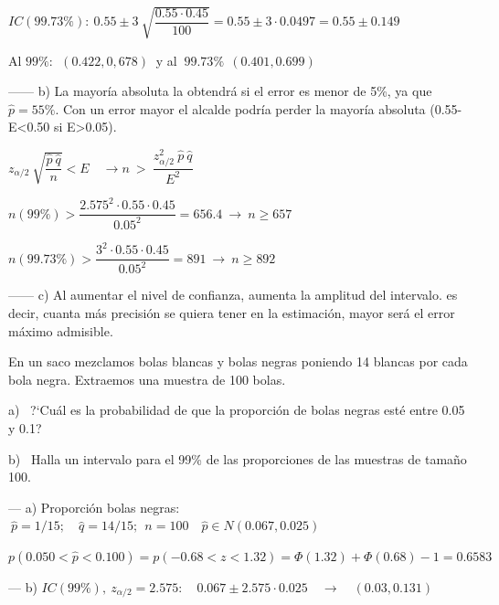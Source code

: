 \vspace{2mm} $IC(99.73\%):\ 0.55  \pm 3 \ \sqrt{ \dfrac{0.55 \cdot 0.45}{100}} = 0.55\pm 3\cdot 0.0497=0.55\pm 0.149$

\vspace{2mm} Al $99\%:\ \ (0.422,0,678 ) \ $ y al $\ 99.73\% \ \ (0.401,0.699)$

\vspace{2mm} ------ b) La mayoría absoluta la obtendrá si el error es menor de 5\%, ya que $\widehat p=55\%$. Con un error mayor el alcalde podría perder la mayoría absoluta (0.55-E<0.50 si E>0.05).

\vspace{2mm} $z_{\alpha/2} \  \sqrt{\dfrac{\hat p \  \hat q}{n}} < E \quad  \to  n\ >\ \dfrac{z^2_{\alpha/2} \ \hat p \ \hat q}{E^2}$

\vspace{2mm} $n(99\%)>\dfrac{2.575^2\cdot 0.55\cdot 0.45}{0.05^2}=656.4\ \to \ n\ge 657$

\vspace{2mm} $n(99.73\%)>\dfrac{3^2\cdot 0.55\cdot 0.45}{0.05^2}=891 \ \to \ n\ge 892$

\vspace{2mm} ------ c) Al aumentar el nivel de confianza, aumenta la amplitud del intervalo. es decir, cuanta más precisión se quiera tener en la estimación, mayor será el error máximo admisible.


\vspace{5mm} %
\begin{ejemplo}
\begin{ejer}
	En un saco mezclamos bolas blancas y bolas negras poniendo 14 blancas por cada bola negra. Extraemos una muestra de 100 bolas.
 
a)  ?`Cuál es la probabilidad de que la proporción de bolas negras esté entre 0.05 y 0.1? 

b)  Halla un intervalo para el 99\% de las proporciones de las muestras de tamaño 100. 
\end{ejer}	
\end{ejemplo}

\vspace{2mm} --- a) Proporción bolas negras: $\ \widehat p=1/15;\quad \widehat q=14/15;\ \ n=100 \quad \widehat p \in N(0.067,0.025) $

\vspace{2mm} $p(0.050< \widehat p < 0.100)=p(-0.68<z<1.32)=\Phi(1.32)+\Phi(0.68)-1=0.6583$

\vspace{2mm} --- b) $IC(99\%),\ z_{\alpha/2}=2.575:\quad 0.067\pm 2.575\cdot 0.025 \quad \to \quad (0.03,0.131)$



